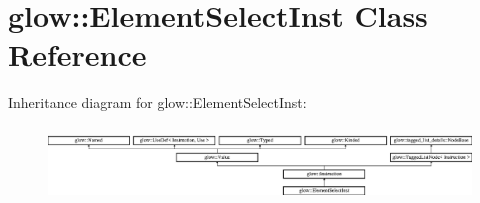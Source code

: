 \hypertarget{classglow_1_1_element_select_inst}{}\section{glow\+:\+:Element\+Select\+Inst Class Reference}
\label{classglow_1_1_element_select_inst}
Inheritance diagram for glow\+:\+:Element\+Select\+Inst\+:\begin{figure}[H]
\begin{center}
\leavevmode
\includegraphics[height=1.991111cm]{classglow_1_1_element_select_inst}
\end{center}
\end{figure}
